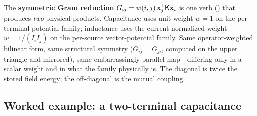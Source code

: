 \begin{keyidea}
The \textbf{symmetric Gram reduction} $G_{ij}=w(i,j)\,\mathbf{x}_j^{\!\top}\mathsf{K}\mathbf{x}_i$ is
one verb () that produces \emph{two} physical products.
Capacitance uses unit weight $w=1$ on the per-terminal potential family;
inductance uses the current-normalized weight $w=1/(I_iI_j)$ on the per-source
vector-potential family. Same operator-weighted bilinear form, same structural
symmetry ($G_{ij}=G_{ji}$, computed on the upper triangle and mirrored), same
embarrassingly parallel map---differing only in a scalar weight and in what the
family physically is. The diagonal is twice the stored field energy; the
off-diagonal is the mutual coupling.
\end{keyidea}

\subsection{Worked example: a two-terminal capacitance}

